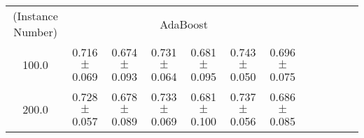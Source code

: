 \documentclass{article}
\theoremstyle{plain}
\begin{document}
\begin{table*}
\begin{center}
{\begin{tabular}{*{12}{c}}
\cmidrule(lr){1-1}
\cmidrule(lr){1-7}
(Instance Number)& \multicolumn{6}{c}{AdaBoost}\\
\cmidrule(lr){1-7}
100.0&0.716 $\pm$ 0.069&0.674 $\pm$ 0.093&0.731 $\pm$0.064&0.681 $\pm$ 0.095&0.743 $\pm$ 0.050&0.696 $\pm$ 0.075\\
200.0&0.728 $\pm$ 0.057&0.678 $\pm$ 0.089&0.733 $\pm$ 0.069&0.681 $\pm$ 0.100&0.737 $\pm$ 0.056&0.686 $\pm$ 0.085\\

\bottomrule

\end{tabular}
}
\end{center}
\label{tab:main-result}
\vspace{-5mm}
\end{table*}
\end{document}
